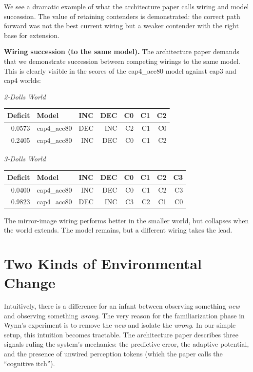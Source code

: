 \documentclass[12pt, a4paper]{article}
\begin{document}
We see a dramatic example of what the architecture paper calls wiring and model
succession. The value of retaining contenders is demonstrated: the correct path
forward was not the best current wiring but a weaker contender with the right
base for extension.

\textbf{Wiring succession (to the same model).} The architecture paper demands
that we demonstrate succession between competing wirings to the same model.
This is clearly visible in the scores of the cap4\_acc80 model against cap3
and cap4 worlds:

\medskip
\noindent\textit{2-Dolls World}
\begin{center}
\begin{tabular}{rlrrrrr}
\toprule
Deficit & Model & INC & DEC & C0 & C1 & C2 \\
\midrule
0.0573 & cap4\_acc80 & DEC & INC & C2 & C1 & C0 \\
0.2405 & cap4\_acc80 & INC & DEC & C0 & C1 & C2 \\
\bottomrule
\end{tabular}
\end{center}

\noindent\textit{3-Dolls World}
\begin{center}
\begin{tabular}{rlrrrrrr}
\toprule
Deficit & Model & INC & DEC & C0 & C1 & C2 & C3 \\
\midrule
0.0400 & cap4\_acc80 & INC & DEC & C0 & C1 & C2 & C3 \\
0.9823 & cap4\_acc80 & DEC & INC & C3 & C2 & C1 & C0 \\
\bottomrule
\end{tabular}
\end{center}

The mirror-image wiring performs better in the smaller world, but collapses
when the world extends. The model remains, but a different wiring takes the
lead.

\section{Two Kinds of Environmental Change}
\label{sec:twokinds}

Intuitively, there is a difference for an infant between observing something
\textit{new} and observing something \textit{wrong}. The very reason for the
familiarization phase in Wynn's experiment is to remove the \textit{new} and
isolate the \textit{wrong}. In our simple setup, this intuition becomes
tractable. The architecture paper describes three signals ruling the system's
mechanics: the predictive error, the adaptive potential, and the presence of
unwired perception tokens (which the paper calls the ``cognitive itch'').
\end{document}
